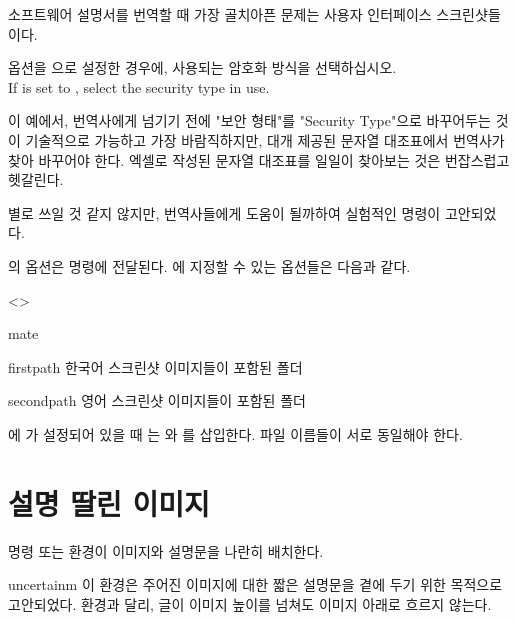 \documentclass[minted]{hzguide}
\begin{document}
소프트웨어 설명서를 번역할 때 가장 골치아픈 문제는 사용자 인터페이스 스크린샷들이다.

\begin{reference}
 옵션을 으로 설정한 경우에, 사용되는 암호화 방식을 선택하십시오. \\
If  is set to , select the security type in use.
\end{reference}

이 예에서, 번역사에게 넘기기 전에 "보안 형태"를 "Security Type"으로 바꾸어두는 것이 기술적으로 가능하고 가장 바람직하지만, 
대개 제공된 문자열 대조표에서 번역사가 찾아 바꾸어야 한다.
엑셀로 작성된 문자열 대조표를 일일이 찾아보는 것은 번잡스럽고 헷갈린다.

별로 쓰일 것 같지 않지만, 번역사들에게 도움이 될까하여 실험적인 \macro{\mateimage} 명령이 고안되었다.

\begin{code}
\end{code}

\macro{\mateimage}의 옵션은 \macro{\image} 명령에 전달된다.
\macro{\MateSetup}에 지정할 수 있는 옵션들은 다음과 같다.

\begin{macros}<\MateSetup>
\item[mate] 
\item[firstpath] 
한국어 스크린샷 이미지들이 포함된 폴더
\item[secondpath] 
영어 스크린샷 이미지들이 포함된 폴더
\end{macros}

에 가 설정되어 있을 때 는 와 를 삽입한다.
파일 이름들이 서로 동일해야 한다.

\section{설명 딸린 이미지}

\macro{\illustimage} 명령 또는  환경이 이미지와 설명문을 나란히 배치한다.

\begin{coderesult}
\begin{IllustImage}{uncertainm}
이 환경은 주어진 이미지에 대한 짧은 설명문을 곁에 두기 위한 목적으로 고안되었다.
 환경과 달리, 글이 이미지 높이를 넘쳐도 이미지 아래로 흐르지 않는다.
\end{IllustImage}
\end{coderesult}
\end{document}
